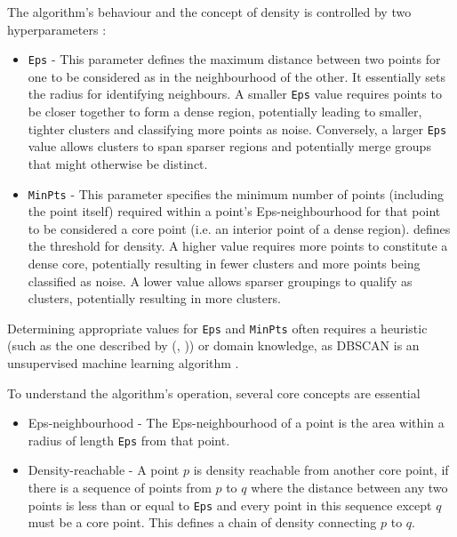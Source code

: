 \documentclass[10pt,oneside]{report}
\renewcommand{\citet}[1]{\citeauthor{#1}, \citeyear{#1}}
\begin{document}
The algorithm's behaviour and the concept of density is controlled by two hyperparameters \cite{ester1996density}:
\begin{itemize}
    \item \texttt{Eps} - This parameter defines the maximum distance between two points for one to be considered as in the neighbourhood of the other. It essentially sets the radius for identifying neighbours. A smaller \texttt{Eps} value requires points to be closer together to form a dense region, potentially leading to smaller, tighter clusters and classifying more points as noise. Conversely, a larger \texttt{Eps} value allows clusters to span sparser regions and potentially merge groups that might otherwise be distinct.
    \item \texttt{MinPts} - This parameter specifies the minimum number of points (including the point itself) required within a point's Eps-neighbourhood for that point to be considered a core point (i.e. an interior point of a dense region).  defines the threshold for density. A higher value requires more points to constitute a dense core, potentially resulting in fewer clusters and more points being classified as noise. A lower value allows sparser groupings to qualify as clusters, potentially resulting in more clusters.
\end{itemize}

Determining appropriate values for \texttt{Eps} and \texttt{MinPts} often requires a heuristic (such as the one described by (\citet{ester1996density})) or domain knowledge, as DBSCAN is an unsupervised machine learning algorithm \cite{ester1996density}.

To understand the algorithm's operation, several core concepts are essential \cite{ester1996density} \begin{itemize}
    \item Eps-neighbourhood - The Eps-neighbourhood of a point is the area within a radius of length \texttt{Eps} from that point.
    \item Density-reachable - A point $p$ is density reachable from another core point, if there is a sequence of points from $p$ to $q$ where the distance between any two points is less than or equal to \texttt{Eps} and every point in this sequence except $q$ must be a core point. This defines a chain of density connecting $p$ to $q$.
\end{itemize}
\end{document}
